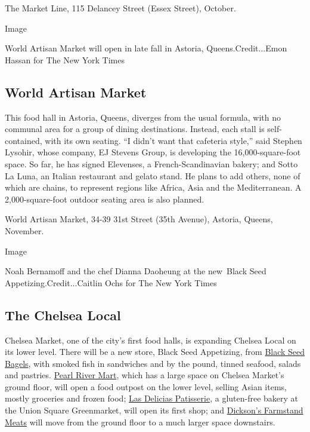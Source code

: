 The Market Line, 115 Delancey Street (Essex Street), October.

Image

World Artisan Market will open in late fall in Astoria,
Queens.Credit...Emon Hassan for The New York Times

\hypertarget{world-artisan-market}{%
\subsection{World Artisan Market}\label{world-artisan-market}}

This food hall in Astoria, Queens, diverges from the usual formula, with
no communal area for a group of dining destinations. Instead, each stall
is self-contained, with its own seating. ``I didn't want that cafeteria
style,'' said Stephen Lysohir, whose company, EJ Stevens Group, is
developing the 16,000-square-foot space. So far, he has signed
Elevenses, a French-Scandinavian bakery; and Sotto La Luna, an Italian
restaurant and gelato stand. He plans to add others, none of which are
chains, to represent regions like Africa, Asia and the Mediterranean. A
2,000-square-foot outdoor seating area is also planned.

World Artisan Market, 34-39 31st Street (35th Avenue), Astoria, Queens,
November.

Image

Noah Bernamoff and the chef Dianna Daoheung at the new~Black Seed
Appetizing.Credit...Caitlin Ochs for The New York Times

\hypertarget{the-chelsea-local}{%
\subsection{The Chelsea Local}\label{the-chelsea-local}}

Chelsea Market, one of the city's first food halls, is expanding Chelsea
Local on its lower level. There will be a new store, Black Seed
Appetizing, from \href{https://www.blackseedbagels.com/}{Black Seed
Bagels}, with smoked fish in sandwiches and by the pound, tinned
seafood, salads and pastries. \href{https://pearlriver.com/}{Pearl River
Mart}, which has a large space on Chelsea Market's ground floor, will
open a food outpost on the lower level, selling Asian items, mostly
groceries and frozen food; \href{https://lasdeliciaspatisserie.com/}{Las
Delicias Patisserie}, a gluten-free bakery at the Union Square
Greenmarket, will open its first shop; and
\href{https://www.dicksonsfarmstand.com/}{Dickson's Farmstand Meats}
will move from the ground floor to a much larger space downstairs.

